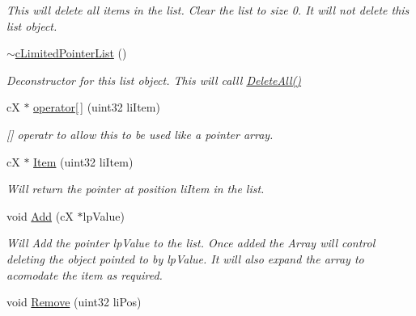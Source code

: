 \begin{DoxyCompactItemize}
\begin{DoxyCompactList}\small\item\em This will delete all items in the list. Clear the list to size 0. It will not delete this list object. \end{DoxyCompactList}\item 
\hypertarget{classc_limited_pointer_list_a4aef178a850d901cefc169cd0f8b1e71}{
\hyperlink{classc_limited_pointer_list_a4aef178a850d901cefc169cd0f8b1e71}{$\sim$cLimitedPointerList} ()}
\label{classc_limited_pointer_list_a4aef178a850d901cefc169cd0f8b1e71}

\begin{DoxyCompactList}\small\item\em Deconstructor for this list object. This will calll \hyperlink{classc_limited_pointer_list_a5cd2eaf04fa51a23e35bb78ba875501f}{DeleteAll()} \end{DoxyCompactList}\item 
\hypertarget{classc_limited_pointer_list_a118f2d5687c97cf122b163dbbdedb56d}{
cX $\ast$ \hyperlink{classc_limited_pointer_list_a118f2d5687c97cf122b163dbbdedb56d}{operator\mbox{[}$\,$\mbox{]}} (uint32 liItem)}
\label{classc_limited_pointer_list_a118f2d5687c97cf122b163dbbdedb56d}

\begin{DoxyCompactList}\small\item\em \mbox{[}\mbox{]} operatr to allow this to be used like a pointer array. \end{DoxyCompactList}\item 
\hypertarget{classc_limited_pointer_list_a00af27280f0a9d3f89fa8b9da36b7554}{
cX $\ast$ \hyperlink{classc_limited_pointer_list_a00af27280f0a9d3f89fa8b9da36b7554}{Item} (uint32 liItem)}
\label{classc_limited_pointer_list_a00af27280f0a9d3f89fa8b9da36b7554}

\begin{DoxyCompactList}\small\item\em Will return the pointer at position liItem in the list. \end{DoxyCompactList}\item 
\hypertarget{classc_limited_pointer_list_a0ba95ea83cbfee5957645c711ccab08c}{
void \hyperlink{classc_limited_pointer_list_a0ba95ea83cbfee5957645c711ccab08c}{Add} (cX $\ast$lpValue)}
\label{classc_limited_pointer_list_a0ba95ea83cbfee5957645c711ccab08c}

\begin{DoxyCompactList}\small\item\em Will Add the pointer lpValue to the list. Once added the Array will control deleting the object pointed to by lpValue. It will also expand the array to acomodate the item as required. \end{DoxyCompactList}\item 
\hypertarget{classc_limited_pointer_list_a61fdd759615a826b5f385ad0b9ddfb0d}{
void \hyperlink{classc_limited_pointer_list_a61fdd759615a826b5f385ad0b9ddfb0d}{Remove} (uint32 liPos)}
\label{classc_limited_pointer_list_a61fdd759615a826b5f385ad0b9ddfb0d}


\end{DoxyCompactItemize}
